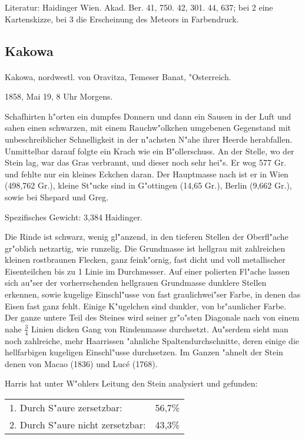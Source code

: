 \documentclass[a4paper, 11pt, oneside]{article}
\begin{document}
\footnotesize
Literatur: Haidinger Wien. Akad. Ber. 41, 750. 42, 301. 44, 637; bei 2 eine Kartenskizze, bei 3 die Erscheinung des Meteors in Farbendruck.

\subsection{Kakowa}
\normalsize
\paragraph{}
Kakowa, nordwestl. von Oravitza, Temeser Banat, "Osterreich.

1858, Mai 19, 8 Uhr Morgens.

Schafhirten h"orten ein dumpfes Donnern und dann ein Sausen in der Luft und sahen einen schwarzen, mit einem Rauchw"olkchen umgebenen Gegenstand mit unbeschreiblicher Schnelligkeit in der n"achsten N"ahe ihrer Heerde herabfallen. Unmittelbar darauf folgte ein Krach wie ein B"ollerschuss. An der Stelle, wo der Stein lag, war das Gras verbrannt, und dieser noch sehr hei"s. Er wog 577 Gr. und fehlte nur ein kleines Eckchen daran. Der Hauptmasse nach ist er in Wien (498,762 Gr.), kleine St"ucke sind in G"ottingen (14,65 Gr.), Berlin (9,662 Gr.), sowie bei Shepard und Greg.

Spezifisches Gewicht: 3,384 Haidinger.

Die Rinde ist schwarz, wenig gl"anzend, in den tieferen Stellen der Oberfl"ache gr"oblich netzartig, wie runzelig. Die Grundmasse ist hellgrau mit zahlreichen kleinen rostbraunen Flecken, ganz feink"ornig, fast dicht und voll metallischer Eisenteilchen bis zu 1 Linie im Durchmesser. Auf einer polierten Fl"ache lassen sich au"ser der vorherrschenden hellgrauen Grundmasse dunklere Stellen erkennen, sowie kugelige Einschl"usse von fast graulichwei"ser Farbe, in denen das Eisen fast ganz fehlt. Einige K"ugelchen sind dunkler, von br"aunlicher Farbe. Der ganze untere Teil des Steines wird seiner gr"o"sten Diagonale nach von einem nahe $\frac{3}{4}$ Linien dicken Gang von Rindenmasse durchsetzt. Au"serdem sieht man noch zahlreiche, mehr Haarrissen "ahnliche Spaltendurchschnitte, deren einige die hellfarbigen kugeligen Einschl"usse durchsetzen. Im Ganzen "ahnelt der Stein denen von Macao (1836) und Lucé (1768).

Harris hat unter W"ohlers Leitung den Stein analysiert und gefunden:
\begin{table}[H]
    \centering
    \begin{tabular}{l r}
        1. Durch S"aure zersetzbar: & 56,7\% \\
        2. Durch S"aure nicht zersetzbar: & 43,3\% \\
    \end{tabular}
\end{table}
\end{document}
